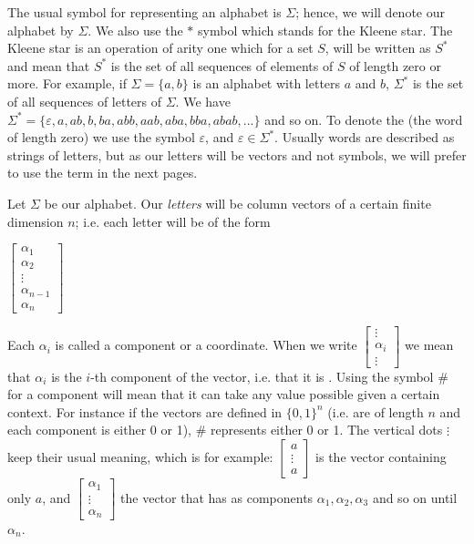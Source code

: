 \documentclass[12pt]{article}
\begin{document}
The usual symbol for representing an alphabet is $\Sigma$; hence, we will denote our alphabet by $\Sigma$. We also use the $*$ symbol which stands for the Kleene star. The Kleene star is an operation of arity one which for a set $S$, will be written as $S^*$ and mean that $S^*$ is the set of all sequences of elements of $S$ of length zero or more. For example, if $\Sigma=\{a,b\}$ is an alphabet with letters $a$ and $b$, $\Sigma^*$ is the set of all sequences of letters of $\Sigma$. We have $\Sigma^*=\{\varepsilon,a,ab,b,ba,abb,aab,aba,bba,abab,...\}$ and so on. To denote the  (the word of length zero) we use the symbol $\varepsilon$, and $\varepsilon\in\Sigma^*$. Usually words are described as strings of letters, but as our letters will be vectors and not symbols, we will prefer to use the term  in the next pages.

Let $\Sigma$ be our alphabet. Our \textsl{letters} will be column vectors of a certain finite dimension $n$; i.e. each letter will be of the form

\begin{center}
{
$\begin{bmatrix}
\alpha_1 \\
\alpha_2 \\
\vdots \\
\alpha_{n-1} \\
\alpha_n
\end{bmatrix}$
}

\end{center}
\vspace{1em}

Each $\alpha_i$ is called a component or a coordinate. When we write 
$\begin{bmatrix} \vdots \\ \alpha_i \\ \vdots \end{bmatrix}
$
we mean that $\alpha_i$ is the $i$-th component of the vector, i.e. that it is . Using the symbol \# for a component will mean that it can take any value possible given a certain context. For instance if the vectors are defined in $\{0,1\}^n$ (i.e. are of length $n$ and each component is either 0 or 1), \# represents either 0 or 1. The vertical dots $\vdots$ keep their usual meaning, which is for example: 
$\begin{bmatrix}
a \\
\vdots \\
a
\end{bmatrix}$ is the vector containing only $a$, and 
$\begin{bmatrix}
\alpha_1 \\
\vdots \\
\alpha_n
\end{bmatrix}$ the vector that has as components $\alpha_1,\alpha_2,\alpha_3$ and so on until $\alpha_n$.
\end{document}
